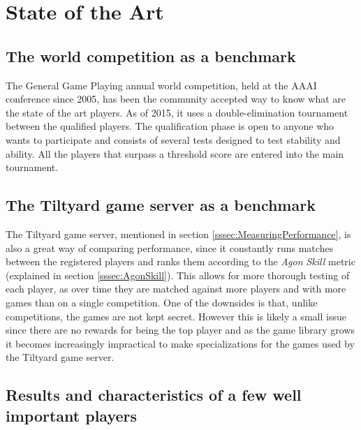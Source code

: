 
\chapter{State of the Art}
\label{chapter:state_of_the_art}

\section{The world competition as a benchmark}
The General Game Playing annual world competition, held at the AAAI conference since 2005, has been the community accepted way to know what are the state of the art players. 
As of 2015, it uses a double-elimination tournament between the qualified players.
The qualification phase is open to anyone who wants to participate and consists of several tests designed to test stability and ability. All the players that surpass a threshold score are entered into the main tournament.


\section{The Tiltyard game server as a benchmark}

The Tiltyard game server, mentioned in section \ref{sssec:MeasuringPerformance}, is also a great way of comparing performance, since it constantly runs matches between the registered players and ranks them according to the \textit{Agon Skill} metric (explained in section \ref{sssec:AgonSkill}). This allows for more thorough testing of each player, as over time they are matched against more players and with more games than on a single competition. One of the downsides is that, unlike competitions, the games are not kept secret. However this is likely a small issue since there are no rewards for being the top player and as the game library grows it becomes increasingly impractical to make specializations for the games used by the Tiltyard game server.



\section{Results and characteristics of a few well important players}

